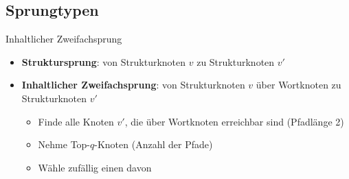 \subsection{Sprungtypen}
\begin{frame}{Inhaltlicher Zweifachsprung}
    \begin{itemize}
        \item<1-> \textbf{Struktursprung}: von Strukturknoten $v$ zu Strukturknoten $v'$
        \item<2-> \textbf{Inhaltlicher Zweifachsprung}: von Strukturknoten $v$ über Wortknoten zu Strukturknoten $v'$
        \begin{itemize}
            \item<3-> Finde alle Knoten $v'$, die über Wortknoten erreichbar sind (Pfadlänge 2)
            \item<4-> Nehme Top-$q$-Knoten (Anzahl der Pfade)
            \item<5-> Wähle zufällig einen davon
        \end{itemize}
    \end{itemize}
\end{frame}
